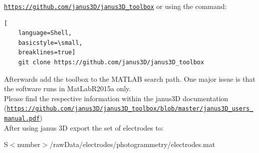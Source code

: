 \documentclass[12pt,a4paper]{scrartcl}
\begin{document}
\href{https://github.com/janus3D/janus3D_toolbox}{\nolinkurl{https://github.com/janus3D/janus3D_toolbox}} or using the command:\\

\begin{lstlisting}[
    language=Shell,
    basicstyle=\small,
    breaklines=true]
    git clone https://github.com/janus3D/janus3D_toolbox
\end{lstlisting}

Afterwards add the toolbox to the MATLAB search path. One major issue is that the software runs in MatLabR2015a only.\\
Please find the respective information within the janus3D documentation (\href{https://github.com/janus3D/janus3D_toolbox/blob/master/janus3D_users_manual.pdf}{\nolinkurl{https://github.com/janus3D/janus3D_toolbox/blob/master/janus3D_users_manual.pdf}})\\

\noindent After using janus 3D export the set of electrodes to:\\
\begin{center}
  S$<$number$>$/rawData/electrodes/photogrammetry/electrodes.mat
\end{center}
\end{document}
